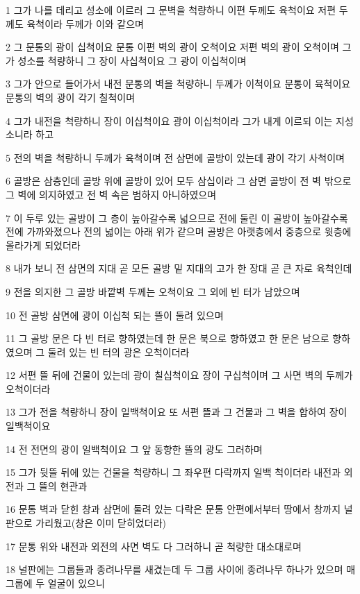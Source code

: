 \par 1 그가 나를 데리고 성소에 이르러 그 문벽을 척량하니 이편 두께도 육척이요 저편 두께도 육척이라 두께가 이와 같으며
\par 2 그 문통의 광이 십척이요 문통 이편 벽의 광이 오척이요 저편 벽의 광이 오척이며 그가 성소를 척량하니 그 장이 사십척이요 그 광이 이십척이며
\par 3 그가 안으로 들어가서 내전 문통의 벽을 척량하니 두께가 이척이요 문통이 육척이요 문통의 벽의 광이 각기 칠척이며
\par 4 그가 내전을 척량하니 장이 이십척이요 광이 이십척이라 그가 내게 이르되 이는 지성소니라 하고
\par 5 전의 벽을 척량하니 두께가 육척이며 전 삼면에 골방이 있는데 광이 각기 사척이며
\par 6 골방은 삼층인데 골방 위에 골방이 있어 모두 삼십이라 그 삼면 골방이 전 벽 밖으로 그 벽에 의지하였고 전 벽 속은 범하지 아니하였으며
\par 7 이 두루 있는 골방이 그 층이 높아갈수록 넓으므로 전에 둘린 이 골방이 높아갈수록 전에 가까와졌으나 전의 넓이는 아래 위가 같으며 골방은 아랫층에서 중층으로 윗층에 올라가게 되었더라
\par 8 내가 보니 전 삼면의 지대 곧 모든 골방 밑 지대의 고가 한 장대 곧 큰 자로 육척인데
\par 9 전을 의지한 그 골방 바깥벽 두께는 오척이요 그 외에 빈 터가 남았으며
\par 10 전 골방 삼면에 광이 이십척 되는 뜰이 둘려 있으며
\par 11 그 골방 문은 다 빈 터로 향하였는데 한 문은 북으로 향하였고 한 문은 남으로 향하였으며 그 둘려 있는 빈 터의 광은 오척이더라
\par 12 서편 뜰 뒤에 건물이 있는데 광이 칠십척이요 장이 구십척이며 그 사면 벽의 두께가 오척이더라
\par 13 그가 전을 척량하니 장이 일백척이요 또 서편 뜰과 그 건물과 그 벽을 합하여 장이 일백척이요
\par 14 전 전면의 광이 일백척이요 그 앞 동향한 뜰의 광도 그러하며
\par 15 그가 뒷뜰 뒤에 있는 건물을 척량하니 그 좌우편 다락까지 일백 척이더라 내전과 외전과 그 뜰의 현관과
\par 16 문통 벽과 닫힌 창과 삼면에 둘려 있는 다락은 문통 안편에서부터 땅에서 창까지 널판으로 가리웠고(창은 이미 닫히었더라)
\par 17 문통 위와 내전과 외전의 사면 벽도 다 그러하니 곧 척량한 대소대로며
\par 18 널판에는 그룹들과 종려나무를 새겼는데 두 그룹 사이에 종려나무 하나가 있으며 매 그룹에 두 얼굴이 있으니
